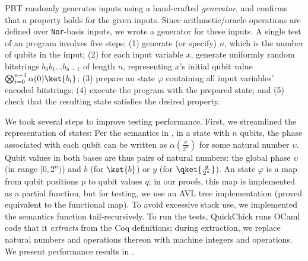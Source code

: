 
PBT randomly generates inputs using a hand-crafted \emph{generator}, 
and confirms that a property holds for the given inputs. Since
arithmetic/oracle operations are defined over \texttt{Nor}-basis
inputs, we wrote a generator for these inputs. 
%
A single test of an \oqasm program involves five steps:
(1) generate (or specify) $n$, which is the number of qubits in the input;
(2) for each input variable $x$, generate uniformly random bitstrings $b_0b_1...b_{n-1}$ of length $n$, representing $x$'s initial qubit value $\bigotimes_{i=0}^{n-1} \alpha(0)\ket{b_i}$;
(3) prepare an \oqasm state $\varphi$ containing all input variables' encoded bitstrings;
(4) execute the \oqasm program with the prepared state; and
(5) check that the resulting state satisfies the desired property.

We took several steps to improve testing performance. 
First, we streamlined the representation of states:
Per the semantics in , in a state with $n$ qubits, the phase associated with each qubit can be written as $\alpha(\frac{\upsilon}{2^n})$ for some natural number $\upsilon$. 
Qubit values in both bases are thus pairs of natural numbers: the global phase $\upsilon$ (in range $[0,2^n)$) and $b$ (for $\ket{b}$) or $y$ (for $\qket{\frac{y}{2^n}}$). 
An \oqasm state $\varphi$ is a map from qubit positions $p$ to qubit values $q$; in our proofs, this map is implemented as a partial function, but for testing, we use an AVL tree implementation (proved equivalent to the functional map). 
To avoid excessive stack use, we implemented the \oqasm semantics function tail-recursively. 
To run the tests, QuickChick runs OCaml code that it \emph{extracts} from the Coq definitions; during extraction, we replace natural numbers and operations thereon with machine integers and operations. We present performance results in .


